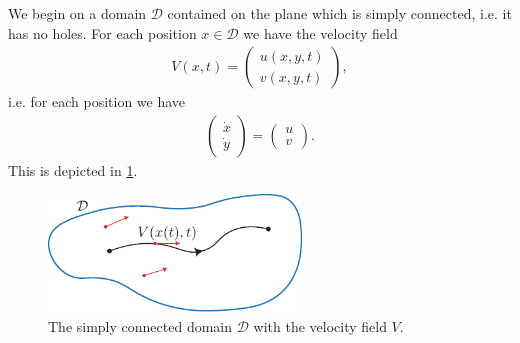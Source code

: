 \begin{ex}
	We begin on a domain $\mathcal{D}$ contained on the plane which is simply connected, i.e. it has no holes. For each position $x\in \mathcal{D}$ we have the velocity field
	\begin{align}
		{V}(x,t) = 
		\begin{pmatrix}
			u(x,y,t) \\ v(x,y,t)
		\end{pmatrix},
	\end{align}
	i.e. for each position we have
	 \begin{align}
		\begin{pmatrix}
			\dot{x} \\ \dot{y}
		\end{pmatrix}
		= 
		\begin{pmatrix}
			u \\v
		\end{pmatrix}
		.
	\end{align}
This is depicted in \ref{fig:incompressible}.
\begin{figure}[h!]
	\centering
	\includegraphics[width=0.6\textwidth]{figures/ch7/2_5simply_connected.pdf}
	\caption{The simply connected domain $\mathcal{D}$ with the velocity field $V$.}
	\label{fig:incompressible}
\end{figure}


\end{ex}
